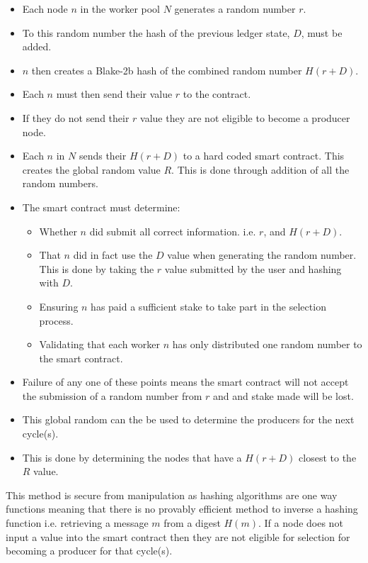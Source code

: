 \documentclass{article}
\begin{document}
\begin{itemize}

\item Each node $n$ in the worker pool $N$ generates a random number $r$.
\item To this random number the hash of the previous ledger state, $D$, must be added.
\item $n$ then creates a Blake-2b hash of the combined random number $H(r + D)$.
\item Each $n$ must then send their value $r$ to the contract.
\item If they do not send their $r$ value they are not eligible to become a producer node.
\item Each $n$ in $N$ sends their $H(r + D)$ to a hard coded smart contract. This creates the global random value $R$. This is done through addition of all the random numbers.
\item The smart contract must determine:
\begin{itemize}
\item Whether $n$ did submit all correct information. i.e. $r$, and $H(r+D)$.
\item That $n$ did in fact use the $D$ value when generating the random number. This is done by taking the $r$ value submitted by the user and hashing with $D$.
\item Ensuring $n$ has paid a sufficient stake to take part in the selection process.
\item Validating that each worker $n$ has only distributed one random number to the smart contract.
\end{itemize}
\item Failure of any one of these points means the smart contract will not accept the submission of a random number from $r$ and and stake made will be lost.
\item This global random can the be used to determine the producers for the next cycle(s).
\item This is done by determining the nodes that have a $H(r + D)$ closest to the $R$ value. \\

\end{itemize}


This method is secure from manipulation as hashing algorithms are one way functions meaning that there is no provably efficient method to inverse a hashing function i.e. retrieving a message $m$ from a digest $H(m)$. If a node does not input a value into the smart contract then they are not eligible for selection for becoming a producer for that cycle(s). \\
\end{document}
